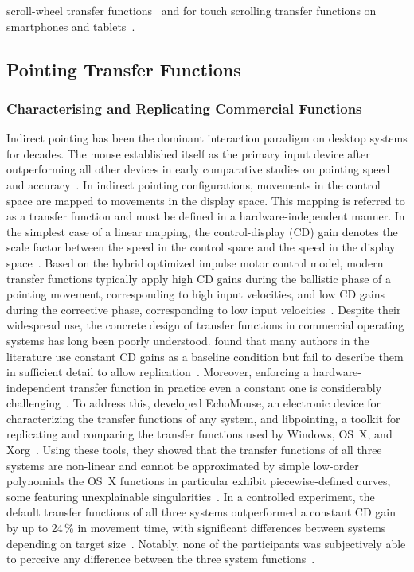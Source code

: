 scroll-wheel transfer functions~\cite{quinn2012exposing} and for touch scrolling transfer functions on smartphones and tablets~\cite{quinn2013touch}.

\subsection{Pointing Transfer Functions}

\subsubsection{Characterising and Replicating Commercial Functions}

Indirect pointing has been the dominant interaction paradigm on desktop systems for decades. The mouse established itself as the primary input device after outperforming all other devices in early comparative studies on pointing speed and accuracy~\cite{casiez2011no}. In indirect pointing configurations, movements in the control space are mapped to movements in the display space. This mapping is referred to as a transfer function and must be defined in a hardware-independent manner. In the simplest case of a linear mapping, the control-display (CD) gain denotes the scale factor between the speed in the control space and the speed in the display space~\cite{casiez2011no}. Based on the hybrid optimized impulse motor control model, modern transfer functions typically apply high CD gains during the ballistic phase of a pointing movement, corresponding to high input velocities, and low CD gains during the corrective phase, corresponding to low input velocities~\cite{eddy2026tftune}. Despite their widespread use, the concrete design of transfer functions in commercial operating systems has long been poorly understood. \citeauthor{casiez2011no} found that many authors in the literature use constant CD gains as a baseline condition but fail to describe them in sufficient detail to allow replication~\cite{casiez2011no}. Moreover, enforcing a hardware-independent transfer function in practice even a constant one is considerably challenging~\cite{casiez2011no}. To address this, \citeauthor{casiez2011no} developed EchoMouse, an electronic device for characterizing the transfer functions of any system, and libpointing, a toolkit for replicating and comparing the transfer functions used by Windows, OS~X, and Xorg~\cite{casiez2011no}. Using these tools, they showed that the transfer functions of all three systems are non-linear and cannot be approximated by simple low-order polynomials the OS~X functions in particular exhibit piecewise-defined curves, some featuring unexplainable singularities~\cite{casiez2011no}. In a controlled experiment, the default transfer functions of all three systems outperformed a constant CD gain by up to 24\,\% in movement time, with significant differences between systems depending on target size~\cite{casiez2011no}. Notably, none of the participants was subjectively able to perceive any difference between the three system functions~\cite{casiez2011no}.

